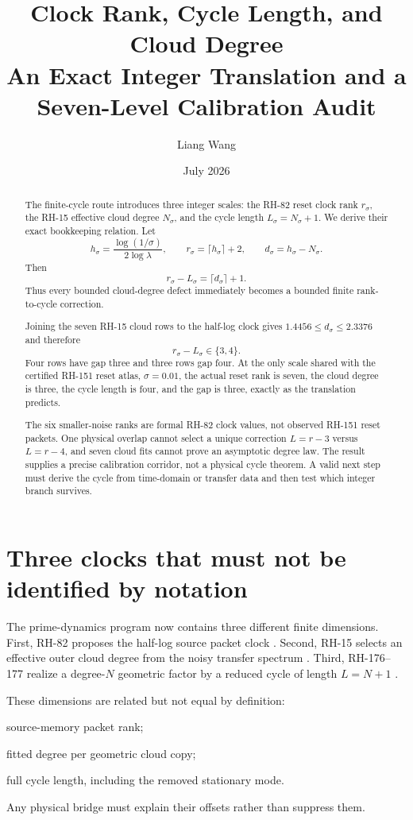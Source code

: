 \documentclass[12pt]{article}
\title{Clock Rank, Cycle Length, and Cloud Degree\\
\large An Exact Integer Translation and a Seven-Level Calibration Audit}
\author{Liang Wang}
\date{July 2026}
\theoremstyle{remark}
\begin{document}
\maketitle

\begin{abstract}
The finite-cycle route introduces three integer scales: the RH-82 reset clock
rank $r_\sigma$, the RH-15 effective cloud degree $N_\sigma$, and the cycle
length $L_\sigma=N_\sigma+1$.  We derive their exact bookkeeping relation.
Let
\[
 h_\sigma=\frac{\log(1/\sigma)}{2\log\lambda},
 \qquad r_\sigma=\lceil h_\sigma\rceil+2,
 \qquad d_\sigma=h_\sigma-N_\sigma.
\]
Then
\[
 r_\sigma-L_\sigma=\lceil d_\sigma\rceil+1.
\]
Thus every bounded cloud-degree defect immediately becomes a bounded finite
rank-to-cycle correction.

Joining the seven RH-15 cloud rows to the half-log clock gives
$1.4456\le d_\sigma\le2.3376$ and therefore
\[
 r_\sigma-L_\sigma\in\{3,4\}.
\]
Four rows have gap three and three rows gap four.  At the only scale shared
with the certified RH-151 reset atlas, $\sigma=0.01$, the actual reset rank is
seven, the cloud degree is three, the cycle length is four, and the gap is
three, exactly as the translation predicts.

The six smaller-noise ranks are formal RH-82 clock values, not observed
RH-151 reset packets.  One physical overlap cannot select a unique correction
$L=r-3$ versus $L=r-4$, and seven cloud fits cannot prove an asymptotic degree
law.  The result supplies a precise calibration corridor, not a physical
cycle theorem.  A valid next step must derive the cycle from time-domain or
transfer data and then test which integer branch survives.
\end{abstract}

\section{Three clocks that must not be identified by notation}

The prime-dynamics program now contains three different finite dimensions.
First, RH-82 proposes the half-log source packet clock
\citep{WangRH82}.  Second, RH-15 selects an effective outer cloud degree from
the noisy transfer spectrum \citep{WangRH15}.  Third, RH-176--177 realize a
degree-$N$ geometric factor by a reduced cycle of length $L=N+1$
\citep{WangRH176,WangRH177}.

These dimensions are related but not equal by definition:
\begin{description}[leftmargin=3.5em,style=nextline]
\item[$r_\sigma$] source-memory packet rank;
\item[$N_\sigma$] fitted degree per geometric cloud copy;
\item[$L_\sigma$] full cycle length, including the removed stationary mode.
\end{description}
Any physical bridge must explain their offsets rather than suppress them.
\end{document}
